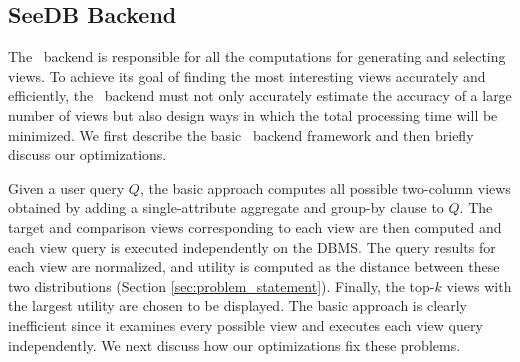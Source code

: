 \subsection{SeeDB Backend}
\label{subsec:seedb_backend}

The \SeeDB\ backend is responsible for all the computations for 
generating and selecting views. 
To achieve its goal of finding the most
interesting views accurately and efficiently, the \SeeDB\ backend must not only accurately
estimate the accuracy of a large number of views but also design ways in which
the total processing time will be minimized.
We first describe the basic \SeeDB\ backend framework and then briefly discuss our optimizations.


Given a user query $Q$, the basic approach computes all
possible two-column views obtained by adding a single-attribute aggregate and group-by clause to $Q$. 
The target and comparison views corresponding to each view are then
computed and each view query is executed independently on the DBMS. The query
results for each view are normalized, and utility is computed as the
distance between these two distributions (Section \ref{sec:problem_statement}).
Finally, the top-$k$ views with the largest utility are chosen to be displayed. 
The basic approach is clearly inefficient
since it examines every possible view 
and executes each view query independently.
We next discuss how our optimizations fix these problems.

